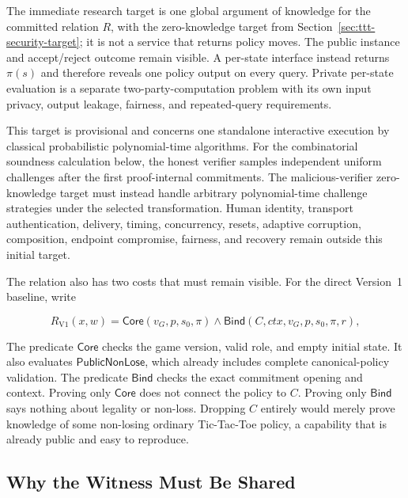 The immediate research target is one global argument of knowledge for the
committed relation $R$, with the zero-knowledge target from
Section~\ref{sec:ttt-security-target}; it is not a service that returns policy
moves. The public instance and accept/reject outcome remain visible. A
per-state interface instead returns $\pi(s)$ and therefore reveals one policy
output on every query. Private per-state evaluation is a separate
two-party-computation problem with its own input privacy, output leakage,
fairness, and repeated-query requirements.

This target is provisional and concerns one standalone interactive execution
by classical probabilistic polynomial-time algorithms. For the combinatorial
soundness calculation below, the honest verifier samples independent uniform
challenges after the first proof-internal commitments. The malicious-verifier
zero-knowledge target must instead handle arbitrary polynomial-time challenge
strategies under the selected transformation. Human identity, transport
authentication, delivery, timing, concurrency, resets, adaptive corruption,
composition, endpoint compromise, fairness, and recovery remain outside this
initial target.

The relation also has two costs that must remain visible. For the direct
Version~1 baseline, write

\begin{equation}
\label{eq:ttt-v1-relation}
 R_{\mathrm{V1}}(x,w)=\mathsf{Core}(v_G,p,s_0,\pi)
        \land \mathsf{Bind}(C,\mathit{ctx},v_G,p,s_0,\pi,r),
\end{equation}

The predicate $\mathsf{Core}$ checks the game version, valid role, and empty
initial state. It also evaluates $\mathsf{PublicNonLose}$, which already
includes complete canonical-policy validation. The predicate $\mathsf{Bind}$
checks the exact commitment opening and context. Proving only $\mathsf{Core}$
does not connect the policy to $C$. Proving only $\mathsf{Bind}$ says nothing
about legality or non-loss.
Dropping $C$ entirely would merely prove knowledge of some non-losing ordinary
Tic-Tac-Toe policy, a capability that is already public and easy to reproduce.

\subsection{Why the Witness Must Be Shared}
\label{sec:ttt-shared-witness}

\begin{center}
\end{center}

